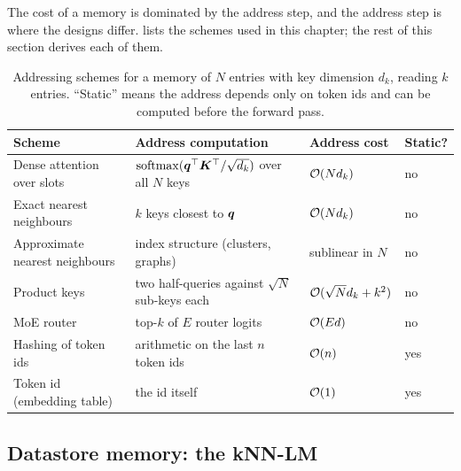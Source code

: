 The cost of a memory is dominated by the address step, and the address step is where the designs
differ.  lists the schemes used in this chapter; the rest of this section
derives each of them.

\begin{table}[t]
\centering
\small
\caption{Addressing schemes for a memory of $N$ entries with key dimension $d_k$, reading $k$
entries. ``Static'' means the address depends only on token ids and can be computed before the
forward pass.}
\label{tab:c10-addressing}
\begin{tabularx}{\linewidth}{@{}lXll@{}}
\toprule
Scheme & Address computation & Address cost & Static? \\
\midrule
Dense attention over slots & $\operatorname{softmax}(\bm{q}^{\top}\bm{K}^{\top}/\sqrt{d_k})$ over all $N$ keys & $\mathcal{O}(N d_k)$ & no \\
Exact nearest neighbours & $k$ keys closest to $\bm{q}$ & $\mathcal{O}(N d_k)$ & no \\
Approximate nearest neighbours & index structure (clusters, graphs) & sublinear in $N$ & no \\
Product keys & two half-queries against $\sqrt{N}$ sub-keys each & $\mathcal{O}(\sqrt{N} d_k + k^2)$ & no \\
MoE router & top-$k$ of $E$ router logits & $\mathcal{O}(E d)$ & no \\
Hashing of token ids & arithmetic on the last $n$ token ids & $\mathcal{O}(n)$ & yes \\
Token id (embedding table) & the id itself & $\mathcal{O}(1)$ & yes \\
\bottomrule
\end{tabularx}
\end{table}

\subsection{Datastore memory: the kNN-LM}\label{sec:c10-knnlm}

